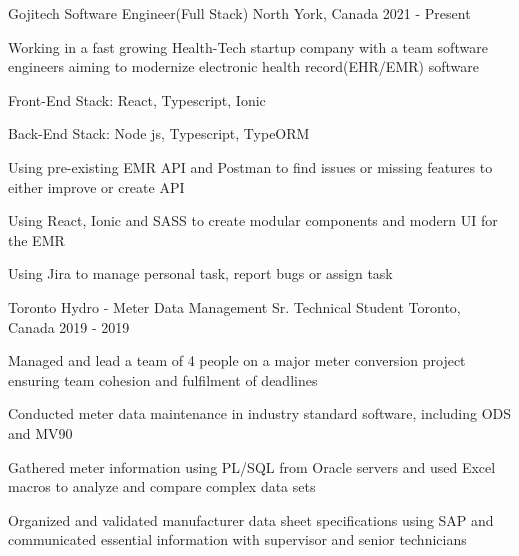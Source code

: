 


\begin{cventries}


\cventry
{Gojitech} %
{Software Engineer(Full Stack)} %
{North York, Canada} %
{2021 - Present} %
{ %
\begin{cvitems}
\item {Working in a fast growing Health-Tech startup company with a team software engineers aiming to modernize electronic health record(EHR/EMR) software}
\item {Front-End Stack: React, Typescript, Ionic}
\item {Back-End Stack: Node js, Typescript, TypeORM}
\item {Using pre-existing EMR API and Postman to find issues or missing features to either improve or create API}
\item {Using React, Ionic and SASS to create modular components and modern UI for the EMR}
\item {Using Jira to manage personal task, report bugs or assign task  }
\end{cvitems}
}




\cventry
{Toronto Hydro - Meter Data Management} %
{Sr. Technical Student} %
{Toronto, Canada} %
{2019 - 2019} %
{ %
\begin{cvitems}
\item {Managed and lead a team of 4 people on a major meter conversion project ensuring team cohesion and fulfilment of deadlines}
\item {Conducted meter data maintenance in industry standard software, including ODS and MV90}
\item {Gathered meter information using PL/SQL from Oracle servers and used Excel macros to analyze and compare complex data sets}
\item {Organized and validated manufacturer data sheet specifications using SAP and communicated essential information with supervisor and senior technicians}
\end{cvitems}
}




\end{cventries}
